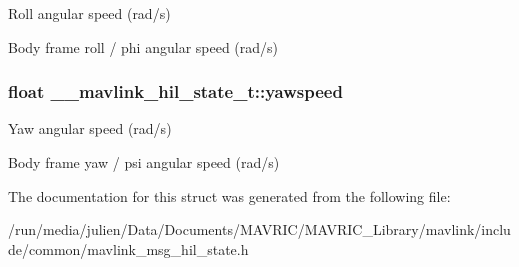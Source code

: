 Roll angular speed (rad/s) 

Body frame roll / phi angular speed (rad/s) \hypertarget{struct____mavlink__hil__state__t_a50f16fd863e535867c95fabcfef2e498}{
\subsubsection[{yawspeed}]{\setlength{\rightskip}{0pt plus 5cm}float \+\_\+\+\_\+mavlink\+\_\+hil\+\_\+state\+\_\+t\+::yawspeed}}\label{struct____mavlink__hil__state__t_a50f16fd863e535867c95fabcfef2e498}


Yaw angular speed (rad/s) 

Body frame yaw / psi angular speed (rad/s) 

The documentation for this struct was generated from the following file\+:\begin{DoxyCompactItemize}
\item 
/run/media/julien/\+Data/\+Documents/\+M\+A\+V\+R\+I\+C/\+M\+A\+V\+R\+I\+C\+\_\+\+Library/mavlink/include/common/mavlink\+\_\+msg\+\_\+hil\+\_\+state.\+h\end{DoxyCompactItemize}
